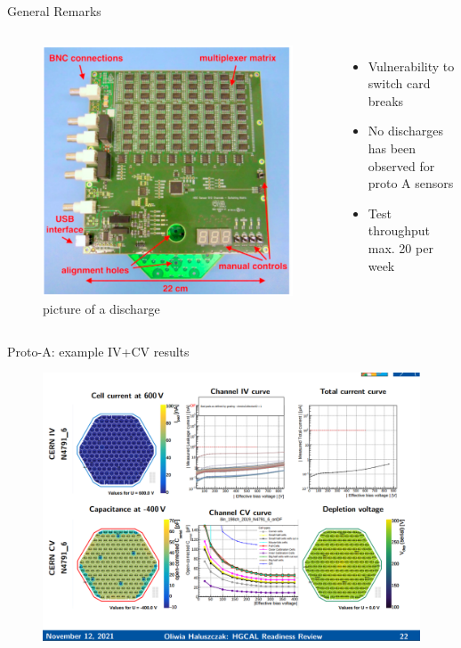\documentclass{beamer}
\begin{document}
\begin{frame}{General Remarks}
  \begin{columns}
      \begin{figure}
        \includegraphics[width=.7\textwidth]{plots/Switch_Card.png}
        \caption{picture of a discharge}
      \end{figure}

    \begin{itemize}
      \small
      \item Vulnerability to switch card breaks
      \item No discharges has been observed for proto A sensors
      \item Test throughput max. 20 per week
    \end{itemize}
  \end{columns}
\end{frame}

\begin{frame}{Proto-A: example IV+CV results}
    \begin{figure}
  \includegraphics[width=.8\textwidth]{plots/IV_CV_example.png}
        
    \end{figure}
\end{frame}
\end{document}
